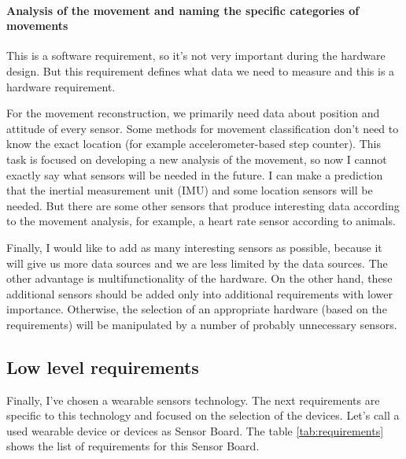 \paragraph{Analysis of the movement and naming the specific categories of movements} This is a software requirement, so it's not very important during the hardware design. But this requirement defines what data we need to measure and this is a hardware requirement.

For the movement reconstruction, we primarily need data about position and attitude of every sensor. Some methods for movement classification don't need to know the exact location (for example accelerometer-based step counter). This task is focused on developing a new analysis of the movement, so now I cannot exactly say what sensors will be needed in the future. I can make a prediction that the inertial measurement unit (\ac{IMU}) and some location sensors will be needed. But there are some other sensors that produce interesting data according to the movement analysis, for example, a heart rate sensor according to animals.

Finally, I would like to add as many interesting sensors as possible, because it will give us more data sources and we are less limited by the data sources. The other advantage is multifunctionality of the hardware. On the other hand, these additional sensors should be added only into additional requirements with lower importance. Otherwise, the selection of an appropriate hardware (based on the requirements) will be manipulated by a number of probably unnecessary sensors.

\subsection{Low level requirements}
Finally, I've chosen a wearable sensors technology. The next requirements are specific to this technology and focused on the selection of the devices. Let's call a used wearable device or devices as Sensor Board. The table \ref{tab:requirements} shows the list of requirements for this Sensor Board.

